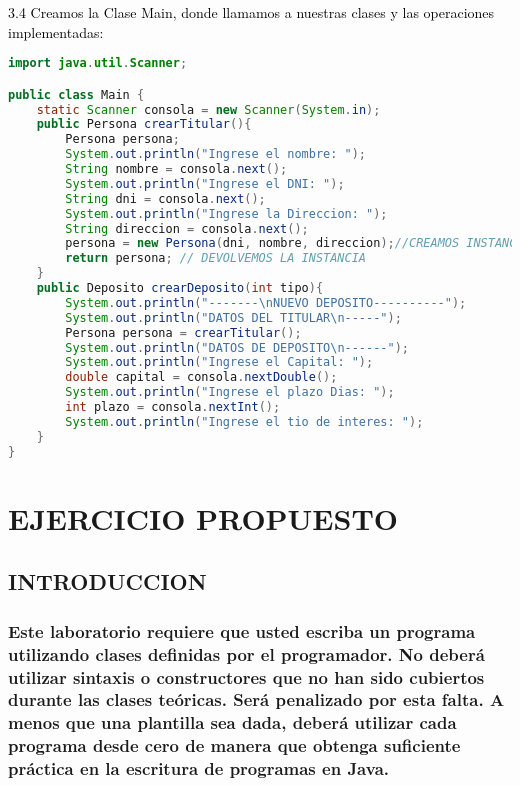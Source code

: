 \documentclass{article}
\begin{document}
\begin{itemize}
\begin{itemize}
\begin{lstlisting}[language=java]
        \end{lstlisting}
        \textcolor{black}{3.4 Creamos la Clase Main, donde llamamos a nuestras clases y las operaciones implementadas:}
        \begin{lstlisting}[language=java]
import java.util.Scanner;

public class Main {
    static Scanner consola = new Scanner(System.in);
    public Persona crearTitular(){
        Persona persona;
        System.out.println("Ingrese el nombre: ");
        String nombre = consola.next();
        System.out.println("Ingrese el DNI: ");
        String dni = consola.next();
        System.out.println("Ingrese la Direccion: ");
        String direccion = consola.next();
        persona = new Persona(dni, nombre, direccion);//CREAMOS INSTANCIA
        return persona; // DEVOLVEMOS LA INSTANCIA
    }
    public Deposito crearDeposito(int tipo){
        System.out.println("-------\nNUEVO DEPOSITO----------");
        System.out.println("DATOS DEL TITULAR\n-----");
        Persona persona = crearTitular();
        System.out.println("DATOS DE DEPOSITO\n------");
        System.out.println("Ingrese el Capital: ");
        double capital = consola.nextDouble();
        System.out.println("Ingrese el plazo Dias: ");
        int plazo = consola.nextInt();
        System.out.println("Ingrese el tio de interes: ");    
    }
}

        \end{lstlisting}
	\end{itemize}
    
    \section{EJERCICIO PROPUESTO}
	\begin{itemize}
        \subsection{INTRODUCCION}
        \subsubsection {Este laboratorio requiere que usted escriba un programa utilizando clases definidas por el programador. No deberá utilizar sintaxis o constructores que no han sido cubiertos durante las clases teóricas. Será penalizado por esta falta. A menos que una plantilla sea dada, deberá utilizar cada programa desde cero de manera que obtenga suficiente práctica en la escritura de programas en Java.}

\end{itemize}
\end{itemize}
\end{document}
